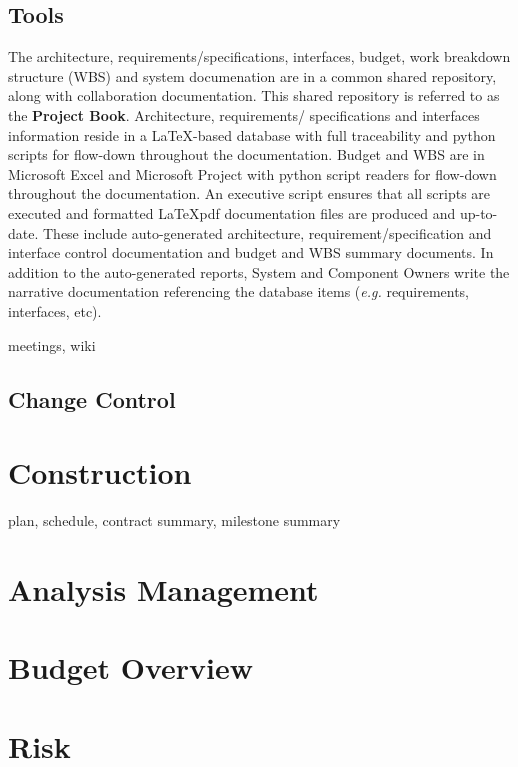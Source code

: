 \documentclass[preprint]{aastex}
\begin{document}
\subsection{Tools}
The architecture, requirements/specifications, interfaces, budget, work breakdown structure
(WBS) and system documenation are in a common shared repository, along with collaboration
documentation.  This shared repository is referred to as the \textbf{Project Book}.  Architecture, requirements/ 
specifications and interfaces information reside in a \LaTeX-based database with full traceability
and python scripts for flow-down throughout the documentation.  Budget and WBS are in Microsoft
Excel and Microsoft Project with python script readers for flow-down throughout the documentation.
An executive script ensures that all scripts are executed and formatted \LaTeX pdf documentation
files are produced and up-to-date.  These include auto-generated architecture, requirement/specification 
and interface control documentation and budget and WBS summary documents.  
In addition to the auto-generated reports, System and  Component Owners write the narrative 
documentation referencing the database items ({\em e.g.} requirements, interfaces, etc).

meetings,  wiki

\subsection{Change Control}

\section{Construction}
plan, schedule, contract summary, milestone summary

\section{Analysis Management}

\section{Budget Overview}

\section{Risk}
\end{document}
